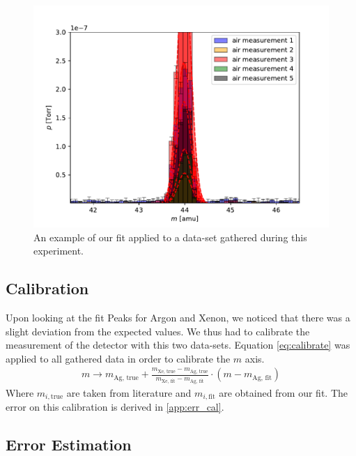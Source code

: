 \begin{figure}[h!]
    \centering
    \includegraphics[width=\textwidth]{Report/DataResultsPlots/peak.pdf}
    \caption{An example of our fit applied to a data-set gathered during this experiment.}
    \label{fig:gauss_int}
\end{figure}


\subsection{Calibration}
Upon looking at the fit Peaks for Argon and Xenon, we noticed that there was a slight deviation from the expected values. We thus had to calibrate the measurement of the detector with this two data-sets. Equation \eqref{eq:calibrate} was applied to all gathered data in order to calibrate the $m$ axis.
\begin{align}
    m \to m_\text{Ag, true} + \frac{m_\text{Xe, true} - m_\text{Ag, true}}{m_\text{Xe, fit} - m_\text{Ag, fit}} \cdot (m - m_\text{Ag, fit}) \label{eq:calibrate}
\end{align}
Where $m_{i, \text{true}}$ are taken from literature and $m_{i, \text{fit}}$ are obtained from our fit.
The error on this calibration is derived in \ref{app:err_cal}.
\subsection{Error Estimation}


